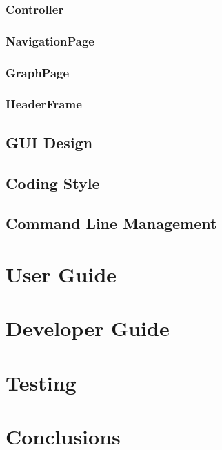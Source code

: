 \documentclass[11pt]{report}
\begin{document}
\subsection{Controller}

\subsection{NavigationPage}

\subsection{GraphPage}

\subsection{HeaderFrame}

\section{GUI Design}

\section{Coding Style}

\section{Command Line Management}

\chapter{User Guide}
\chapter{Developer Guide}
\chapter{Testing}
\chapter{Conclusions}
\end{document}
